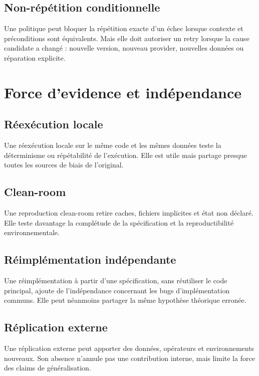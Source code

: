 \section{Non-répétition conditionnelle}

Une politique peut bloquer la répétition exacte d'un échec lorsque contexte et préconditions sont équivalents. Mais elle doit autoriser un retry lorsque la cause candidate a changé : nouvelle version, nouveau provider, nouvelles données ou réparation explicite.

\chapter{Force d'evidence et indépendance}

\section{Réexécution locale}

Une réexécution locale sur le même code et les mêmes données teste la déterminisme ou répétabilité de l'exécution. Elle est utile mais partage presque toutes les sources de biais de l'original.

\section{Clean-room}

Une reproduction clean-room retire caches, fichiers implicites et état non déclaré. Elle teste davantage la complétude de la spécification et la reproductibilité environnementale.

\section{Réimplémentation indépendante}

Une réimplémentation à partir d'une spécification, sans réutiliser le code principal, ajoute de l'indépendance concernant les bugs d'implémentation communs. Elle peut néanmoins partager la même hypothèse théorique erronée.

\section{Réplication externe}

Une réplication externe peut apporter des données, opérateurs et environnements nouveaux. Son absence n'annule pas une contribution interne, mais limite la force des claims de généralisation.

